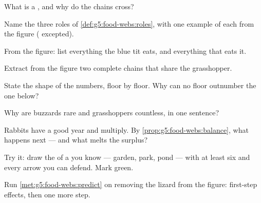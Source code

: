 \begin{exercise}[$\star$]\label{exo:g5:food-webs:1}
What is a , and why do the chains cross?
\end{exercise}

\begin{exercise}[$\star$]\label{exo:g5:food-webs:2}
Name the three roles of \cref{def:g5:food-webs:roles}, with
one example of each from the figure ( excepted).
\end{exercise}

\begin{exercise}[$\star$]\label{exo:g5:food-webs:3}
From the figure: list everything the blue tit eats, and
everything that eats it.
\end{exercise}

\begin{exercise}[$\star$]\label{exo:g5:food-webs:4}
Extract from the figure two complete chains that share the
grasshopper.
\end{exercise}

\begin{exercise}[$\star$]\label{exo:g5:food-webs:5}
State the shape of the numbers, floor by floor. Why can no
floor outnumber the one below?
\end{exercise}

\begin{exercise}[$\star$]\label{exo:g5:food-webs:6}
Why are buzzards rare and grasshoppers countless, in one
sentence?
\end{exercise}

\begin{exercise}[$\star$]\label{exo:g5:food-webs:7}
Rabbits have a good year and multiply. By
\cref{prop:g5:food-webs:balance}, what happens next --- and
what melts the surplus?
\end{exercise}

\begin{exercise}[$\star$]\label{exo:g5:food-webs:8}
Try it: draw the  of a  you know --- garden,
park, pond --- with at least six  and every arrow
you can defend. Mark  green.
\end{exercise}

\begin{exercise}[$\star\star$]\label{exo:g5:food-webs:9}
Run \cref{met:g5:food-webs:predict} on removing the lizard
from the figure: first-step effects, then one more step.
\end{exercise}

